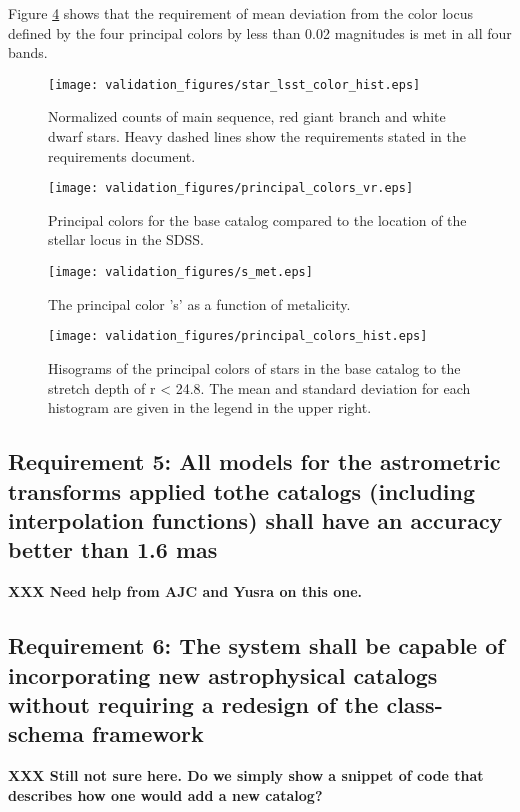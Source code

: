 \documentclass[]{article}
\begin{document}
Figure \ref{fig:principalcolorshist} shows that the requirement of mean deviation from the color locus defined by the four principal colors by less than 
0.02 magnitudes is met in all four bands.
\begin{figure}
\centering
\texttt{[image: validation\_figures/star\_lsst\_color\_hist.eps]}
\caption{Normalized counts of main sequence, red giant branch and white dwarf stars.  Heavy dashed lines show the requirements stated in the requirements document.\label{fig:starcolorspan}}
\end{figure}

\begin{figure}
\centering
\texttt{[image: validation\_figures/principal\_colors\_vr.eps]}
\caption{Principal colors for the base catalog compared to the location of the stellar locus in the SDSS.\label{fig:principalcolors}}
\end{figure}

\begin{figure}
\centering
\texttt{[image: validation\_figures/s\_met.eps]}
\caption{The principal color 's' as a function of metalicity.\label{fig:sfeh}}
\end{figure}

\begin{figure}
\centering
\texttt{[image: validation\_figures/principal\_colors\_hist.eps]}
\caption{Hisograms of the principal colors of stars in the base catalog to the stretch depth of r < 24.8. The mean and standard deviation for each 
histogram are given in the legend in the upper right.\label{fig:principalcolorshist}}
\end{figure}
\subsection{Requirement 5: All models for the astrometric transforms applied tothe catalogs (including interpolation functions) 
shall have an accuracy better than 1.6 mas}
{\bf XXX Need help from AJC and Yusra on this one.}
\subsection{Requirement 6: The system shall be capable of incorporating new astrophysical catalogs without requiring
a redesign of the class-schema framework}
{\bf XXX Still not sure here.  Do we simply show a snippet of code that describes how one would add a new catalog?}
\end{document}
